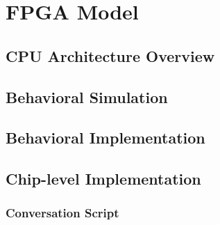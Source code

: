 \chapter{FPGA Model}\label{cha:fpga}
\section{CPU Architecture Overview}
\section{Behavioral Simulation}
\section{Behavioral Implementation}
\section{Chip-level Implementation}
\subsection{Conversation Script}